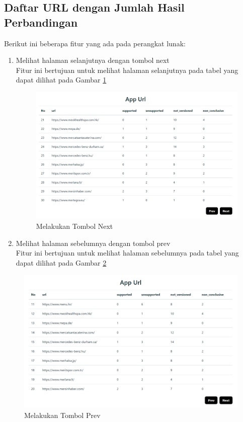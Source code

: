 \subsection{Daftar URL dengan Jumlah Hasil Perbandingan}
Berikut ini beberapa fitur yang ada pada perangkat lunak:
\begin{enumerate}
	\item Melihat halaman selanjutnya dengan tombol next\\
	Fitur ini bertujuan untuk melihat halaman selanjutnya pada tabel yang dapat dilihat pada Gambar \ref{fig:app_url_next}
	\begin{figure}[H]
		\centering  
		\includegraphics[scale=0.5]{Gambar/pengujian11.png}  
		\caption{Melakukan Tombol Next} 
		\label{fig:app_url_next} 
	\end{figure}
	\item Melihat halaman sebelumnya dengan tombol prev\\
	Fitur ini bertujuan untuk melihat halaman sebelumnya pada tabel yang dapat dilihat pada Gambar \ref{fig:app_url_prev}
\end{enumerate}
\begin{figure}[H]
	\centering  
	\includegraphics[scale=0.5]{Gambar/pengujian12.png}  
	\caption{Melakukan Tombol Prev} 
	\label{fig:app_url_prev} 
\end{figure}


